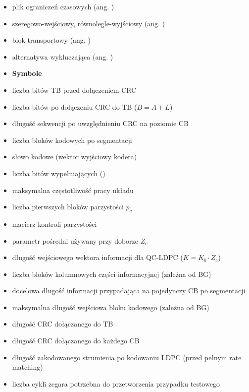 \begin{itemize}
\item[SDC] plik ograniczeń czasowych (ang. )
\item[SIPO] szeregowo-wejściowy, równolegle-wyjściowy (ang. )

\item[TB] blok transportowy (ang. )

\item[XOR] alternatywa wykluczająca (ang. )

\item[] \textbf{Symbole}

\item[$A$] liczba bitów TB przed dołączeniem CRC
\item[$B$] liczba bitów po dołączeniu CRC do TB ($B=A+L$)
\item[$B'$] długość sekwencji po uwzględnieniu CRC na poziomie CB
\item[$C$] liczba bloków kodowych po segmentacji
\item[$c$] słowo kodowe (wektor wyjściowy kodera)
\item[$F$] liczba bitów wypełniających ()
\item[$F_{\max}$] maksymalna częstotliwość pracy układu
\item[$g$] liczba pierwszych bloków parzystości $p_a$
\item[$H$] macierz kontroli parzystości
\item[$k_b$] parametr pośredni używany przy doborze $Z_c$
\item[$K$] długość wejściowego wektora informacji dla QC-LDPC ($K=K_b\cdot Z_c$)
\item[$K_b$] liczba bloków kolumnowych części informacyjnej (zależna od BG)
\item[$K_{CB}$] docelowa długość informacji przypadająca na pojedynczy CB po segmentacji
\item[$K_{CB\_\max}$] maksymalna długość wejściowa bloku kodowego (zależna od BG)
\item[$L$] długość CRC dołączanego do TB
\item[$L_{CB}$] długość CRC dołączanego do każdego CB
\item[$M$] długość zakodowanego strumienia po kodowaniu LDPC (przed pełnym rate matching)
\item[$N_{cykli}$] liczba cykli zegara potrzebna do przetworzenia przypadku testowego

\end{itemize}
